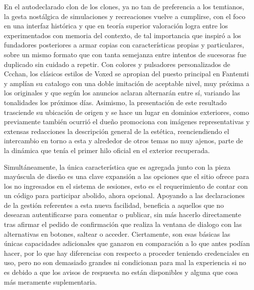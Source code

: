 \documentclass[
]{book}
\begin{document}
En el autodeclarado clon de los clones, ya no tan de preferencia a los temtianos, la gesta nostálgica de simulaciones y recreaciones vuelve a cumplirse, con el foco en una interfaz histórica y que en teoría superior valoración logra entre los experimentados con memoria del contexto, de tal importancia que inspiró a los fundadores posteriores a armar copias con características propias y particulares, sobre un mismo formato que con tanta semejanza entre intentos de sucesoras fue duplicado sin cuidado a repetir. Con colores y pulsadores personalizados de Ccchan, los clásicos estilos de Voxed se apropian del puesto principal en Fantemti y amplían su catalogo con una doble imitación de aceptable nivel, muy próxima a los originales y que según los anuncios aclaran alternarán entre sí, variando las tonalidades los próximos días. Asimismo, la presentación de este resultado trasciende su ubicación de origen y se hace un lugar en dominios exteriores, como previamente también ocurrió el dueño promociona con imágenes representativas y extensas redacciones la descripción general de la estética, reenciendiendo el intercambio en torno a esta y alrededor de otros temas no muy ajenos, parte de la dinámica que tenía el primer hilo oficial en el exterior recuperada.

Simultáneamente, la única característica que es agregada junto con la pieza mayúscula de diseño es una clave expansión a las opciones que el sitio ofrece para los no ingresados en el sistema de sesiones, esto es el requerimiento de contar con un código para participar abolido, ahora opcional. Apoyando a las declaraciones de la gestión referentes a esta nueva facilidad, beneficia a aquellos que no desearan autentificarse para comentar o publicar, sin más hacerlo directamente tras afirmar el pedido de confirmación que realiza la ventana de dialogo con las alternativas en botones, saltear o acceder. Ciertamente, son esas básicas las únicas capacidades adicionales que ganaron en comparación a lo que antes podían hacer, por lo que hay diferencias con respecto a proceder teniendo credenciales en uso, pero no son demasiado grandes ni condicionan para mal la experiencia si no es debido a que los avisos de respuesta no están disponibles y alguna que cosa más meramente suplementaria.
\end{document}
